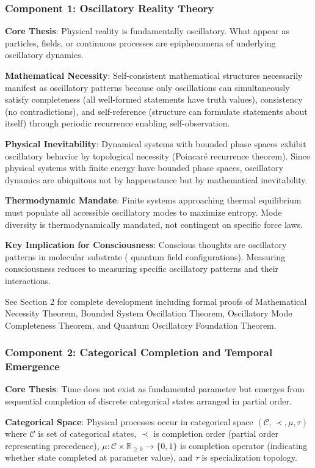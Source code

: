 \documentclass[11pt,onecolumn]{article}
\begin{document}
\subsubsection{Component 1: Oscillatory Reality Theory}

\textbf{Core Thesis}: Physical reality is fundamentally oscillatory. What appear as particles, fields, or continuous processes are epiphenomena of underlying oscillatory dynamics.

\textbf{Mathematical Necessity}: Self-consistent mathematical structures necessarily manifest as oscillatory patterns because only oscillations can simultaneously satisfy completeness (all well-formed statements have truth values), consistency (no contradictions), and self-reference (structure can formulate statements about itself) through periodic recurrence enabling self-observation.

\textbf{Physical Inevitability}: Dynamical systems with bounded phase spaces exhibit oscillatory behavior by topological necessity (Poincar\'e recurrence theorem). Since physical systems with finite energy have bounded phase spaces, oscillatory dynamics are ubiquitous not by happenstance but by mathematical inevitability.

\textbf{Thermodynamic Mandate}: Finite systems approaching thermal equilibrium must populate all accessible oscillatory modes to maximize entropy. Mode diversity is thermodynamically mandated, not contingent on specific force laws.

\textbf{Key Implication for Consciousness}: Conscious thoughts are oscillatory patterns in molecular substrate ( quantum field configurations). Measuring consciousness reduces to measuring specific oscillatory patterns and their interactions.

See Section 2 for complete development including formal proofs of Mathematical Necessity Theorem, Bounded System Oscillation Theorem, Oscillatory Mode Completeness Theorem, and Quantum Oscillatory Foundation Theorem.

\subsubsection{Component 2: Categorical Completion and Temporal Emergence}

\textbf{Core Thesis}: Time does not exist as fundamental parameter but emerges from sequential completion of discrete categorical states arranged in partial order.

\textbf{Categorical Space}: Physical processes occur in categorical space $(\mathcal{C}, \prec, \mu, \tau)$ where $\mathcal{C}$ is set of categorical states, $\prec$ is completion order (partial order representing precedence), $\mu: \mathcal{C} \times \mathbb{R}_{\geq 0} \to \{0,1\}$ is completion operator (indicating whether state completed at parameter value), and $\tau$ is specialization topology.
\end{document}
